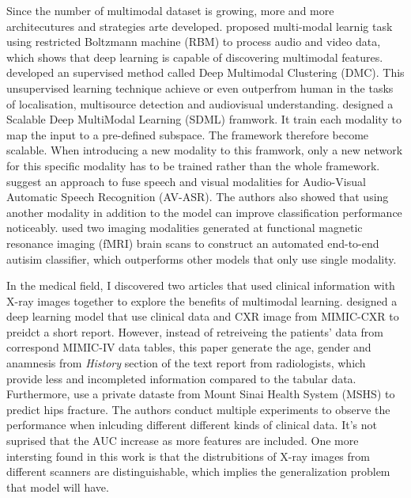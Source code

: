 Since the number of multimodal dataset is growing, more and more architecutures and strategies arte developed. \citet{Ngiam2011MultiModalLearning} proposed multi-modal learnig task using restricted Boltzmann machine (RBM) to process audio and video data, which shows that deep learning is capable of discovering multimodal features. \citet{Hu2019DMC}  developed an supervised method called Deep Multimodal Clustering (DMC). This unsupervised learning technique achieve or even outperfrom human in the tasks of localisation, multisource detection and audiovisual understanding. \citet{Hu2019ScalableMultiModal} designed a Scalable Deep MultiModal Learning (SDML) framwork. It train each modality to map the input to a pre-defined subspace. The framework therefore become scalable. When introducing a new modality to this framwork, only a new network for this specific modality has to be trained rather than the whole framework. \citet{Mroueh2015AudioVisualSpeechRecognitionMultiModal} suggest an approach to fuse speech and visual modalities for Audio-Visual Automatic Speech Recognition (AV-ASR). The authors also showed that using another modality in addition to the model can improve classification performance noticeably. \citet{Tang2020MultiModalAutism} used two imaging modalities generated at functional magnetic resonance imaging (fMRI) brain scans to construct an automated end-to-end autisim classifier, which outperforms other models that only use single modality.

In the medical field, I discovered two articles that used clinical information with X-ray images together to explore the benefits of multimodal learning. \citet{Rodin2019MultimodalMIMICShortReport} designed a deep learning model that use clinical data and CXR image from MIMIC-CXR\citep{Johnson2019MIMIC_CXR} to preidct a short report. However, instead of retreiveing the patients' data from correspond MIMIC-IV data tables, this paper generate the age, gender and anamnesis from \textit{History} section of the text report from radiologists, which provide less and incompleted information compared to the tabular data. Furthermore, \citep{Badgeley2019MultimodalHipFracture} use a private dataste from Mount Sinai Health System (MSHS) to predict hips fracture. The authors conduct multiple experiments to observe the performance when inlcuding different different kinds of clinical data. It's not suprised that the AUC increase as more features are included. One more intersting found in this work is that the distrubitions of X-ray images from different scanners are distinguishable, which implies the generalization problem that model will have.

